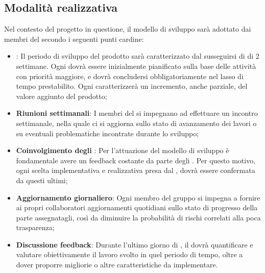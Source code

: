 \subsection{Modalità realizzativa}
Nel contesto del progetto in questione, il modello di sviluppo  sarà adottato dai membri
del  secondo i seguenti punti cardine:
\begin{itemize}
    \item \textbf{}: Il periodo di sviluppo  del prodotto sarà caratterizzato dal susseguirsi di  di 2 settimane. Ogni  dovrà essere inizialmente pianificato sulla base delle attività con priorità maggiore, e dovrà concludersi obbligatoriamente nel lasso di tempo prestabilito. Ogni  caratterizzerà un incremento, anche parziale, del valore aggiunto del prodotto;
    \item \textbf{Riunioni settimanali}: I membri del  si impegnano ad effettuare un incontro settimanale, nella quale ci si aggiorna sullo stato di avanzamento dei lavori o su eventuali problematiche incontrate durante lo sviluppo;
    \item \textbf{Coinvolgimento degli }: Per l’attuazione del modello di sviluppo  è fondamentale avere un feedback costante da parte degli . Per questo motivo, ogni scelta implementativa e realizzativa presa dal , dovrà essere confermata da questi ultimi;
    \item \textbf{Aggiornamento giornaliero}: Ogni membro del gruppo \gruppo{} si impegna a fornire ai propri collaboratori aggiornamenti quotidiani sullo stato di progresso della parte assegnatagli, così da diminuire la probabilità di rischi correlati alla poca trasparenza;
    \item \textbf{Discussione feedback}: Durante l’ultimo giorno di , il  dovrà quantificare e valutare obiettivamente il lavoro svolto in quel periodo di tempo, oltre a dover proporre migliorie o altre caratteristiche da implementare.
\end{itemize}